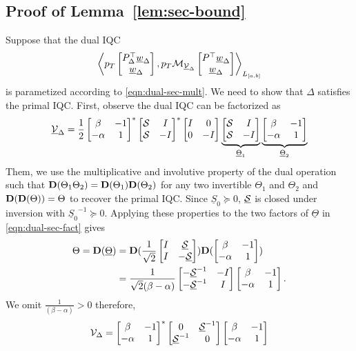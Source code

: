 
\subsection{Proof of Lemma~\ref{lem:sec-bound}}
\label{proof:sec-bound}
Suppose that the dual IQC
\begin{equation*}
     \left\langle p_T\begin{bmatrix}P_\Delta^\top\underline{w}_\Delta \\ \underline{w}_\Delta\end{bmatrix}, p_T \mathcal{M}_{\underline{\mathcal{V}}_\Delta}\begin{bmatrix}P^\top\underline{w}_\Delta \\ \underline{w}_\Delta\end{bmatrix} \right\rangle_{L_{[a,b]}}
\end{equation*}
is parametized according to \eqref{eqn:dual-sec-mult}. We need to show that $\Delta$ satisfies the primal IQC.
First, observe the dual IQC can be factorized as
\begin{equation}\label{eqn:dual-sec-fact}
    \underline{\mathcal{V}}_\Delta = \frac{1}{2}\begin{bmatrix}\beta & -1\\ -\alpha & 1\end{bmatrix}^*
    \begin{bmatrix}\mathcal{S} & I \\ \mathcal{S} & -I\end{bmatrix}^*\begin{bmatrix}I & 0 \\ 0 & -I\end{bmatrix}\underbrace{\begin{bmatrix}\mathcal{S} & I \\ \mathcal{S} & -I\end{bmatrix}}_{\underline{\Theta}_1}\underbrace{\begin{bmatrix}\beta & -1\\ -\alpha & 1\end{bmatrix}}_{\underline{\Theta}_2}
\end{equation}
Them, we use the multiplicative and involutive property of the dual operation such that $\mathbf{D}(\Theta_1\Theta_2)=\mathbf{D}(\Theta_1)\mathbf{D}(\Theta_2)$
for any two invertible $\Theta_1$ and $\Theta_2$  and $\mathbf{D}(\mathbf{D}(\Theta))=\Theta$ to recover the primal IQC.
Since $\underline{S}_0\succeq 0$, $\underline{\mathcal{S}}$ is closed under inversion with ${\underline{S}_0}^{-1}\succeq 0$. 
Applying these properties to the two factors of $\underline{\Theta}$ in \eqref{eqn:dual-sec-fact} gives
\begin{align*}
\Theta = \mathbf{D}(\underline{\Theta})
&=\mathbf{D}(
\frac{1}{\sqrt{2}}
\begin{bmatrix}I&\underline{\mathcal{S}}\\I&-\underline{\mathcal{S}}\end{bmatrix}
)
\mathbf{D}(
\begin{bmatrix}\beta&-1\\-\alpha &1\end{bmatrix}
)\\
&=\frac{1}{\sqrt{2}(\beta-\alpha)}
\begin{bmatrix}-\underline{\mathcal{S}}^{-1}&-I\\-\underline{\mathcal{S}}^{-1}&I\end{bmatrix}
\begin{bmatrix}\beta &-1\\-\alpha&1\end{bmatrix}.
\end{align*}
We omit $\frac{1}{(\beta - \alpha)}>0$ therefore,
\begin{align*}
{\mathcal{V}}_\Delta = \begin{bmatrix}\beta&-1\\-\alpha &1\end{bmatrix}^*
\begin{bmatrix}0&\underline{\mathcal{S}}^{-1}\\\underline{\mathcal{S}}^{-1}&0\end{bmatrix}
\begin{bmatrix}\beta &-1\\-\alpha &1\end{bmatrix}
\end{align*}
